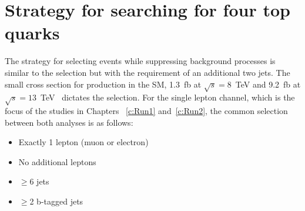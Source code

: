 

\section{Strategy for searching for four top quarks \label{sec:Strategy}}

The strategy for selecting \tttt events while suppressing background processes is similar to the \ttbar selection but with the requirement of an additional two jets. The small cross section for \tttt production in the SM, 1.3~fb at $\sqrt{s}=8$~TeV and 9.2~fb at $\sqrt{s}=13$~TeV~\cite{Alwall2014,Bevilacqua2012} dictates the selection. For the single lepton channel, which is the focus of the studies in Chapters ~\ref{c:Run1} and~\ref{c:Run2}, the common selection between both analyses is as follows:

\begin{itemize}
\item Exactly 1 lepton (muon or electron)
\item No additional leptons
\item $\geq$6 jets
\item $\geq$2 b-tagged jets
\end{itemize}


